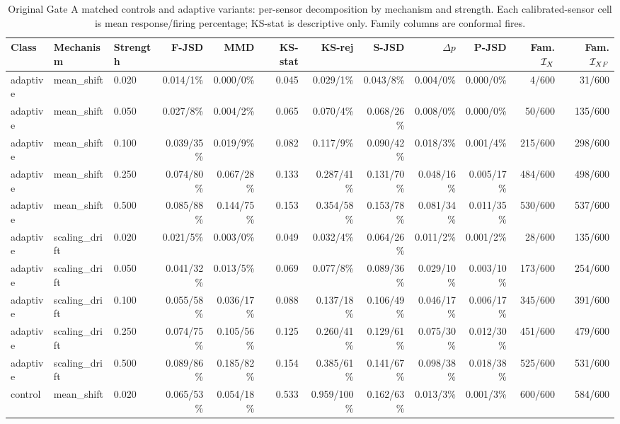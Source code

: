 \begin{table}[!t]
\caption{Original Gate A matched controls and adaptive variants: per-sensor decomposition by mechanism and strength. Each calibrated-sensor cell is mean response/firing percentage; KS-stat is descriptive only. Family columns are conformal fires.}
\label{tab:v137-decomp-3}
\centering\scriptsize\renewcommand{\arraystretch}{0.94}\setlength{\tabcolsep}{2.1pt}
\begin{tabular}{@{}lllrrrrrrrrr@{}}
\toprule
Class & Mechanism & Strength & F-JSD & MMD & KS-stat & KS-rej & S-JSD & $\Delta p$ & P-JSD & Fam. $\mathcal I_X$ & Fam. $\mathcal I_{XF}$ \\
\midrule
adaptive & mean\_shift & 0.020 & 0.014/1\% & 0.000/0\% & 0.045 & 0.029/1\% & 0.043/8\% & 0.004/0\% & 0.000/0\% & 4/600 & 31/600 \\
adaptive & mean\_shift & 0.050 & 0.027/8\% & 0.004/2\% & 0.065 & 0.070/4\% & 0.068/26\% & 0.008/0\% & 0.000/0\% & 50/600 & 135/600 \\
adaptive & mean\_shift & 0.100 & 0.039/35\% & 0.019/9\% & 0.082 & 0.117/9\% & 0.090/42\% & 0.018/3\% & 0.001/4\% & 215/600 & 298/600 \\
adaptive & mean\_shift & 0.250 & 0.074/80\% & 0.067/28\% & 0.133 & 0.287/41\% & 0.131/70\% & 0.048/16\% & 0.005/17\% & 484/600 & 498/600 \\
adaptive & mean\_shift & 0.500 & 0.085/88\% & 0.144/75\% & 0.153 & 0.354/58\% & 0.153/78\% & 0.081/34\% & 0.011/35\% & 530/600 & 537/600 \\
adaptive & scaling\_drift & 0.020 & 0.021/5\% & 0.003/0\% & 0.049 & 0.032/4\% & 0.064/26\% & 0.011/2\% & 0.001/2\% & 28/600 & 135/600 \\
adaptive & scaling\_drift & 0.050 & 0.041/32\% & 0.013/5\% & 0.069 & 0.077/8\% & 0.089/36\% & 0.029/10\% & 0.003/10\% & 173/600 & 254/600 \\
adaptive & scaling\_drift & 0.100 & 0.055/58\% & 0.036/17\% & 0.088 & 0.137/18\% & 0.106/49\% & 0.046/17\% & 0.006/17\% & 345/600 & 391/600 \\
adaptive & scaling\_drift & 0.250 & 0.074/75\% & 0.105/56\% & 0.125 & 0.260/41\% & 0.129/61\% & 0.075/30\% & 0.012/30\% & 451/600 & 479/600 \\
adaptive & scaling\_drift & 0.500 & 0.089/86\% & 0.185/82\% & 0.154 & 0.385/61\% & 0.141/67\% & 0.098/38\% & 0.018/38\% & 525/600 & 531/600 \\
control & mean\_shift & 0.020 & 0.065/53\% & 0.054/18\% & 0.533 & 0.959/100\% & 0.162/63\% & 0.013/3\% & 0.001/3\% & 600/600 & 584/600 \\

\end{tabular}
\end{table}
